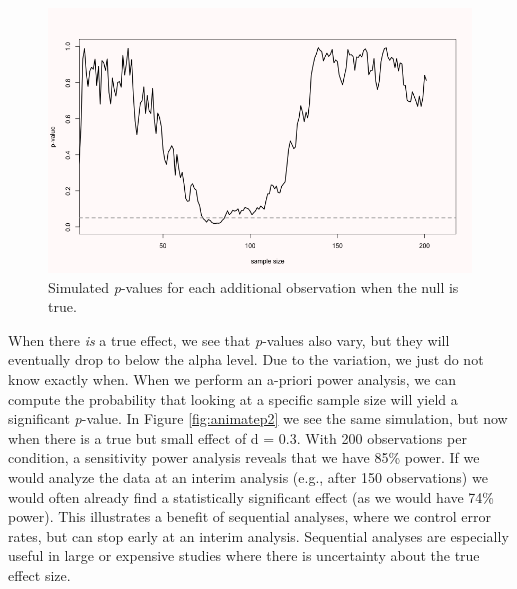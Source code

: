 \documentclass[
  oneside]{krantz}
\begin{document}
\begin{figure}

{\centering \includegraphics[width=1\linewidth]{images/animatep} 

}

\caption{Simulated \emph{p}-values for each additional observation when the null is true.}\label{fig:animatep}
\end{figure}

When there \emph{is} a true effect, we see that \emph{p}-values also vary, but they will eventually drop to below the alpha level. Due to the variation, we just do not know exactly when. When we perform an a-priori power analysis, we can compute the probability that looking at a specific sample size will yield a significant \emph{p}-value. In Figure \ref{fig:animatep2} we see the same simulation, but now when there is a true but small effect of d = 0.3. With 200 observations per condition, a sensitivity power analysis reveals that we have 85\% power. If we would analyze the data at an interim analysis (e.g., after 150 observations) we would often already find a statistically significant effect (as we would have 74\% power). This illustrates a benefit of sequential analyses, where we control error rates, but can stop early at an interim analysis. Sequential analyses are especially useful in large or expensive studies where there is uncertainty about the true effect size.
\end{document}
